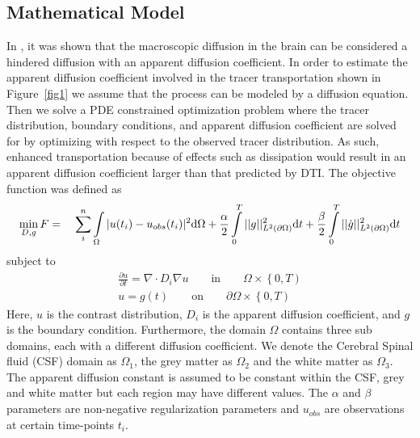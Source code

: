 \documentclass[11pt,a4paper]{article}
\begin{document}
\subsection{Mathematical Model}
In \cite{sykova2008diffusion}, it was shown that the macroscopic diffusion in the brain can be considered a hindered diffusion with an apparent diffusion coefficient. In order to estimate the apparent diffusion coefficient involved in the tracer transportation shown in Figure~\ref{fig1} we assume that the process can be modeled by a diffusion equation. Then we solve a PDE constrained optimization problem where
the tracer distribution, boundary conditions, and apparent
diffusion coefficient are solved for by optimizing with
respect to the observed tracer distribution. As such, enhanced transportation because of effects such as
dissipation would result in an apparent diffusion coefficient larger than that predicted by DTI.  
The objective function was defined as 
\begin{equation}
\min_{D,g} F = \quad \sum\limits_i\sp{n} \int\limits_{\Omega} |u(t_i) - u_{obs}(t_i)|\sp{2} \mathrm{d}\Omega + \frac{\alpha}{2} \int\limits_{0}\sp{T} || g ||\sp{2}_{L\sp{2}(\partial\Omega)} \mathrm{d}t + \frac{\beta}{2} \int\limits_{0}\sp{T} || \dot{g} ||\sp{2}_{L\sp{2}(\partial\Omega)}\mathrm{d}t 
\label{EQ::objf}
\end{equation}
subject to   
\begin{equation}
\begin{aligned}
\frac{\partial u}{\partial t} = \nabla \cdot  D_i \nabla u \qquad \text{in} \qquad \Omega \times \left\lbrace 0 , T \right)  \\
u=g(t) \qquad \text{on} \qquad \partial\Omega  \times \left\lbrace 0 , T \right) 
\end{aligned}
\label{Eq::PDE}
\end{equation}
Here, $u$ is the contrast distribution, $D_i$ is the apparent diffusion 
coefficient, and $g$ is the boundary condition. Furthermore,  
the domain $\Omega$ contains three sub domains, each with a different diffusion coefficient. We denote the Cerebral Spinal fluid (CSF) domain as $\Omega_1$, the grey matter as $\Omega_2$ and the white matter as $\Omega_3$. The apparent
diffusion constant is assumed to be constant within the CSF, grey and 
white matter but each region may have different values.  
The $\alpha$ and $\beta$ parameters are non-negative regularization parameters 
and $u_{obs}$ are observations at certain time-points $t_i$. 
\end{document}
